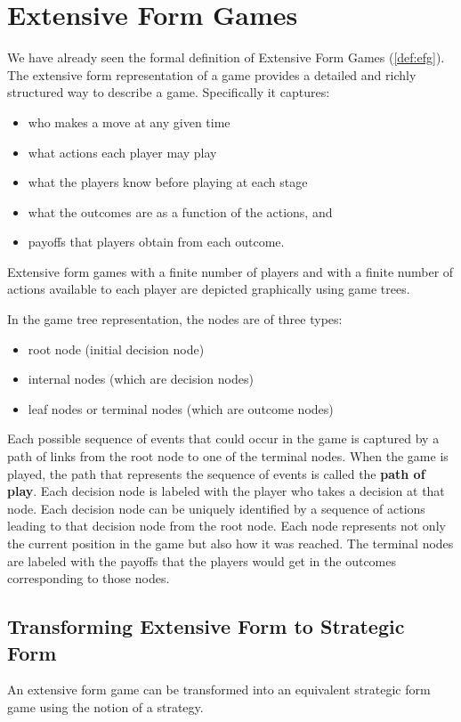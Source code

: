 \section{Extensive Form Games}{\label{sec:efg}}
We have already seen the formal definition of Extensive Form Games (\ref{def:efg}).
The extensive form representation of a game provides a detailed and richly structured way to describe a game.
Specifically it captures:
\begin{itemize}
	\item who makes a move at any given time
	\item what actions each player may play
	\item what the players know before playing at each stage
	\item what the outcomes are as a function of the actions, and
	\item payoffs that players obtain from each outcome.
\end{itemize}
Extensive form games with a finite number of players and with a finite number of actions available to each player are depicted graphically using game trees.

In the game tree representation, the nodes are of three types:
\begin{itemize}
	\item root node (initial decision node)
	\item internal nodes (which are decision nodes)
	\item leaf nodes or terminal nodes (which are outcome nodes)
\end{itemize}
Each possible sequence of events that could occur in the game is captured by a path of links from the root node to one of the terminal nodes. When the game is played, the path that represents the sequence of events is called the \textbf{path of play}.
Each decision node is labeled with the player who takes a decision at that node.
Each decision node can be uniquely identified by a sequence of actions leading to that decision node from the root node.
Each node represents not only the current position in the game but also how it was reached.
The terminal nodes are labeled with the payoffs that the players would get in the outcomes corresponding to those nodes.

\subsection{Transforming Extensive Form to Strategic Form}
An extensive form game can be transformed into an equivalent strategic form game using the notion of a strategy.


